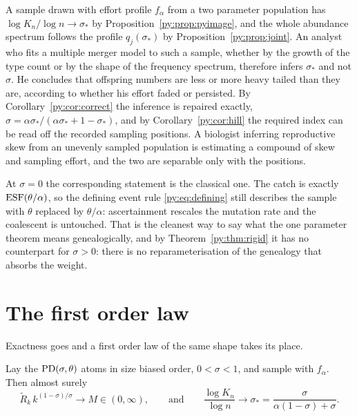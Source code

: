 A sample drawn with effort profile $f_\alpha$ from a two parameter population has
$\log K_n/\log n \to \sigma_*$ by Proposition~\ref{py:prop:pyimage}, and the whole abundance spectrum
follows the profile $q_j(\sigma_*)$ by Proposition~\ref{py:prop:joint}. An analyst who fits a
multiple merger model to such a sample, whether by the growth of the type count or by the shape of
the frequency spectrum, therefore infers $\sigma_*$ and not $\sigma$. He concludes that offspring
numbers are less or more heavy tailed than they are, according to whether his effort faded or
persisted. By Corollary~\ref{py:cor:correct} the inference is repaired exactly,
$\sigma = \alpha\sigma_*/(\alpha\sigma_*+1-\sigma_*)$, and by Corollary~\ref{py:cor:hill} the required
index can be read off the recorded sampling positions. A biologist inferring reproductive skew from
an unevenly sampled population is estimating a compound of skew and sampling effort, and the two
are separable only with the positions.

At $\sigma = 0$ the corresponding statement is the classical one. The catch is exactly
$\mathrm{ESF}(\theta/\alpha)$, so the defining event rule \eqref{py:eq:defining} still describes the sample
with $\theta$ replaced by $\theta/\alpha$: ascertainment rescales the mutation rate and the
coalescent is untouched. That is the cleanest way to say what the one parameter theorem means
genealogically, and by Theorem~\ref{py:thm:rigid} it has no counterpart for $\sigma > 0$: there is no
reparameterisation of the genealogy that absorbs the weight.

\section{The first order law}
\label{py:sec:firstorder}

Exactness goes and a first order law of the same shape takes its place.

\begin{proposition}
\label{py:prop:pyimage}
Lay the $\mathrm{PD}(\sigma,\theta)$ atoms in size biased order, $0 < \sigma < 1$, and sample with
$f_\alpha$. Then almost surely
\begin{equation}
\widetilde R_k\, k^{(1-\sigma)/\sigma} \longrightarrow M \in (0,\infty),
\qquad\text{and}\qquad
\frac{\log K_n}{\log n} \longrightarrow \sigma_* = \frac{\sigma}{\alpha(1-\sigma)+\sigma} .
\label{py:eq:envelope}
\end{equation}
\end{proposition}

